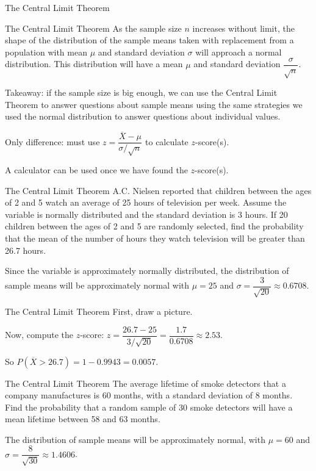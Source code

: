 \documentclass[t, aspectratio=169]{beamer}
\newcommand{\?}{\stackrel{?}{=}}
\begin{document}
	\begin{frame}{The Central Limit Theorem}
		\begin{block}{The Central Limit Theorem}
			As the sample size $n$ increases without limit, the shape of the distribution of the sample means taken with replacement from a population with mean $\mu$ and standard deviation $\sigma$ will approach a normal distribution. This distribution will have a mean $\mu$ and standard deviation $\dfrac{\sigma}{\sqrt{n}}$.
		\end{block} \pause
	
		Takeaway: if the sample size is big enough, we can use the Central Limit Theorem to answer questions about sample means using the same strategies we used the normal distribution to answer questions about individual values. \pause
		
		Only difference: must use $z = \dfrac{\overline{X} - \mu}{\sigma / \sqrt{n}}$ to calculate $z$-score(s). \pause
		
		A calculator can be used once we have found the $z$-score(s).
	\end{frame}

	\begin{frame}{The Central Limit Theorem}
		A.C. Nielsen reported that children between the ages of 2 and 5 watch an average of 25 hours of television per week. Assume the variable is normally distributed and the standard deviation is 3 hours. If 20 children between the ages of 2 and 5 are randomly selected, find the probability that the mean of the number of hours they watch television will be greater than 26.7 hours. \pause
		
		Since the variable is approximately normally distributed, the distribution of sample means will be approximately normal with $\mu = 25$ and $\sigma = \dfrac{3}{\sqrt{20}} \approx 0.6708$.
	\end{frame}

	\begin{frame}{The Central Limit Theorem}
		First, draw a picture. \vspace{1in} \pause
		
		Now, compute the $z$-score: $z = \dfrac{26.7 - 25}{3 / \sqrt{20}} = \dfrac{1.7}{0.6708} \approx 2.53$. \pause
		
		So $P(\overline{X} > 26.7) = 1 - 0.9943 = 0.0057$.
	\end{frame}

	\begin{frame}{The Central Limit Theorem}
		The average lifetime of smoke detectors that a company manufactures is 60 months, with a standard deviation of 8 months. Find the probability that a random sample of 30 smoke detectors will have a mean lifetime between 58 and 63 months. \pause
		
		The distribution of sample means will be approximately normal, with $\mu = 60$ and $\sigma = \dfrac{8}{\sqrt{30}} \approx 1.4606$.
	\end{frame}
\end{document}
